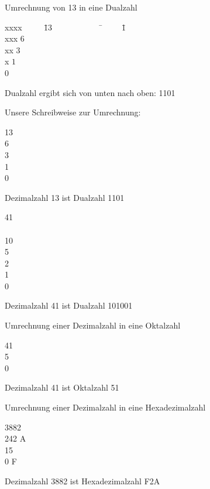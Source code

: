 \documentclass[10pt]{beamer}
\begin{document}
\begin{frame}[fragile]
Umrechnung von 13 in eine Dualzahl   
\begin{tabbing}


xxxx ~~~~ \= 13 ~~~~~~~~~~~ \pause \= ~~~~\= 1 \\
xxx \> $6$ \>   \\
xx \> $3$ \>   \\
x \> $1$ \>   \\
\> $0$ \>  
 \end{tabbing}
Dualzahl ergibt sich von unten nach oben: 1101
\end{frame}

\begin{frame}[fragile]
Unsere Schreibweise zur Umrechnung:
\vspace{-0.3cm}
\begin{tabbing}
13 ~~ \=  \\
6  \\
3  \\
1  \\
0  
 \end{tabbing}
\vspace{-0.3cm}
Dezimalzahl 13 ist Dualzahl 1101  

\vspace{-0.3cm}
\begin{tabbing}
41 ~~ \=  \\   \\
10  \\
5  \\
2 \\
1  \\ 
0 
 \end{tabbing}
\vspace{-0.3cm}
Dezimalzahl 41 ist Dualzahl 101001 
\end{frame}

\begin{frame}[fragile]
Umrechnung einer Dezimalzahl in eine Oktalzahl
\vspace{-0.3cm}
\begin{tabbing}
41 ~~ \pause  \=  \\
5  \\
0 
 \end{tabbing}
\vspace{-0.3cm}
Dezimalzahl 41 ist Oktalzahl 51 \pause

Umrechnung einer Dezimalzahl in eine Hexadezimalzahl
\begin{tabbing}
3882 ~~  \pause \=  \\
242 \> A \\
15  \\
0\> F
 \end{tabbing}
\vspace{-0.3cm}
Dezimalzahl 3882 ist Hexadezimalzahl F2A 
\end{frame}
\end{document}
